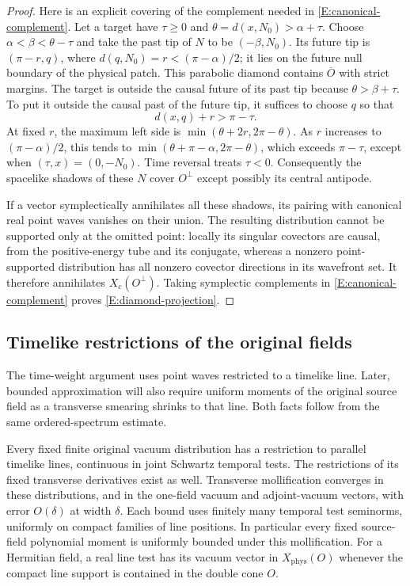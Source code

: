 \begin{proof}
Here is an explicit covering of the complement needed in
\eqref{E:canonical-complement}.  Let a target have $\tau\geq0$ and
$\theta=d(x,N_0)>\alpha+\tau$.  Choose
$\alpha<\beta<\theta-\tau$ and take the past tip of $N$ to be
$(-\beta,N_0)$.  Its future tip is $(\pi-r,q)$, where
$d(q,N_0)=r<(\pi-\alpha)/2$; it lies on the future null boundary of the
physical patch.  This parabolic diamond contains $\overline O$ with
strict margins.  The target is outside the causal future of its past tip
because $\theta>\beta+\tau$.  To put it outside the causal past of the
future tip, it suffices to choose $q$ so that
\[
 d(x,q)+r>\pi-\tau.
\]
At fixed $r$, the maximum left side is
$\min(\theta+2r,2\pi-\theta)$.  As $r$ increases to
$(\pi-\alpha)/2$, this tends to
$\min(\theta+\pi-\alpha,2\pi-\theta)$, which exceeds
$\pi-\tau$, except when $(\tau,x)=(0,-N_0)$.  Time reversal treats
$\tau<0$.  Consequently the spacelike shadows of these $N$ cover
$O^\perp$ except possibly its central antipode.

If a vector symplectically annihilates all these shadows, its pairing
with canonical real point waves vanishes on their union.  The resulting
distribution cannot be supported only at the omitted point: locally its
singular covectors are causal, from the positive-energy tube and its
conjugate, whereas a nonzero point-supported distribution has all
nonzero covector directions in its wavefront set.  It therefore
annihilates $X_c(O^\perp)$.  Taking symplectic complements in
\eqref{E:canonical-complement} proves
\eqref{E:diamond-projection}.
\end{proof}

\subsection{Timelike restrictions of the original fields}

The time-weight argument uses point waves restricted to a timelike
line.  Later, bounded approximation will also require uniform moments
of the original source field as a transverse smearing shrinks to that
line.  Both facts follow from the same ordered-spectrum estimate.

\begin{lemma}\label{E:timelike-restriction}
Every fixed finite original vacuum distribution has a restriction to
parallel timelike lines, continuous in joint Schwartz temporal tests.
The restrictions of its fixed transverse derivatives exist as well.
Transverse mollification converges in these distributions, and in the
one-field vacuum and adjoint-vacuum vectors, with error $O(\delta)$
at width $\delta$.  Each bound uses finitely many temporal test
seminorms, uniformly on compact families of line positions.  In
particular every fixed source-field polynomial moment is uniformly
bounded under this mollification.  For a Hermitian field, a real line
test has its vacuum vector in $X_{\mathrm{phys}}(O)$ whenever the
compact line support is contained in the double cone $O$.
\end{lemma}

